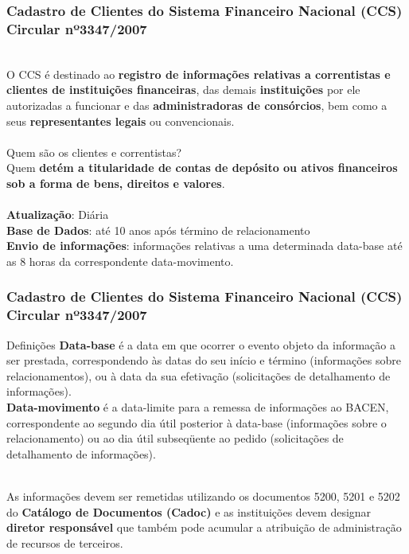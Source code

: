 \documentclass[10pt]{beamer}
\begin{document}
\begin{frame} 
\frametitle{Cadastro de Clientes do Sistema Financeiro Nacional (CCS)\\Circular nº3347/2007}
\\
O CCS é destinado ao \textbf{registro de informações relativas a correntistas e clientes de instituições financeiras}, das demais \textbf{instituições} por ele autorizadas a funcionar e das \textbf{administradoras de consórcios}, bem como a seus \textbf{representantes legais} ou convencionais.
\\~\\
Quem são os clientes e correntistas?
\\
Quem \textbf{detém a titularidade de contas de depósito ou ativos financeiros sob a forma de bens, direitos e valores}.
\\~\\
\textbf{Atualização}: Diária
\\
\textbf{Base de Dados}: até 10 anos após término de relacionamento
\\
\textbf{Envio de informações}: informações relativas a uma determinada data-base até as 8 horas da correspondente data-movimento.
\end{frame}

\begin{frame} 
\frametitle{Cadastro de Clientes do Sistema Financeiro Nacional (CCS)\\Circular nº3347/2007}

\begin{block}{Definições}
\textbf{Data-base} é a data em que ocorrer o evento objeto da informação a ser prestada, correspondendo às datas do seu início e término (informações sobre relacionamentos), ou à data da sua efetivação (solicitações de detalhamento de informações).
\\
\textbf{Data-movimento} é a data-limite para a remessa de informações ao BACEN, correspondente ao segundo dia útil posterior à data-base (informações sobre o relacionamento) ou ao dia útil subseqüente ao pedido (solicitações de detalhamento de informações).
\end{block}
\\
As informações devem ser remetidas utilizando os documentos 5200, 5201 e 5202 do \textbf{Catálogo de Documentos (Cadoc)} e as instituições devem designar \textbf{diretor responsável} que também pode acumular a atribuição de administração de recursos de terceiros.
\end{frame}
\end{document}
